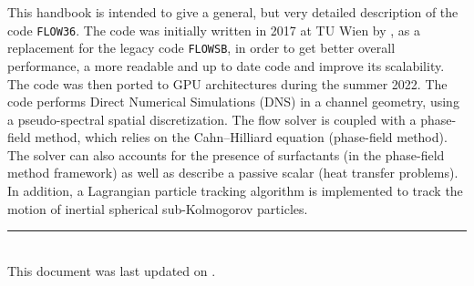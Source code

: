 This handbook is intended to give a general, but very detailed description of the code \texttt{FLOW36}.
The code was initially written in 2017 at TU Wien by \@author, as a replacement for the legacy code \texttt{FLOWSB}, in order to get better overall performance, a more readable and up to date code and improve its scalability.
The code was then ported to GPU architectures during the summer 2022.
The code performs Direct Numerical Simulations (DNS) in a channel geometry, using a pseudo-spectral spatial discretization. 
The flow solver is coupled with a phase-field method, which relies on the Cahn--Hilliard equation (phase-field method).
The solver can also accounts for the presence of surfactants (in the phase-field method framework) as well as describe a passive scalar (heat transfer problems).
In addition, a Lagrangian particle tracking algorithm is implemented to track the motion of inertial spherical sub-Kolmogorov particles.


\vfill
\rule{14cm}{0.4pt}\\

This document was last updated on \@date.